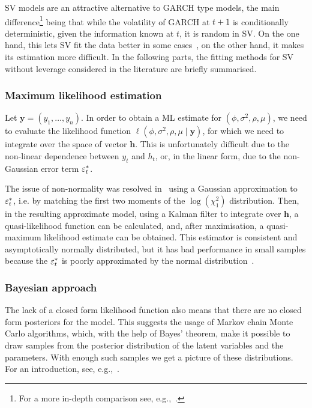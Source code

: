 SV models are an attractive alternative to GARCH type models, the main difference\footnote{For a more in-depth comparison see, e.g.,~\citet{Harvey1994}.} being that while the volatility of GARCH at $t+1$ is conditionally deterministic, given the information known at $t$, it is random in SV.
On the one hand, this lets SV fit the data better in some cases~\citep{Kim1998,Chan2016}, on the other hand, it makes its estimation more difficult. In the following parts, the fitting methods for SV without leverage considered in the literature are briefly summarised.

\subsubsection{Maximum likelihood estimation}

Let $\bm{y}=(y_1,\dots,y_n)$.
In order to obtain a ML estimate for $(\phi,\sigma^2,\rho,\mu)$, we need to evaluate the likelihood function $\ell(\phi,\sigma^2,\rho,\mu\mid\bm{y})$, for which we need to integrate over the space of vector $\bm{h}$.
This is unfortunately difficult due to the non-linear dependence between $y_t$ and $h_t$, or, in the linear form, due to the non-Gaussian error term $\varepsilon_t^\ast$.

The issue of non-normality was resolved in~\citet{Harvey1994} using a Gaussian approximation to $\varepsilon_t^\ast$, i.e. by matching the first two moments of the $\log(\chi_1^2)$ distribution.
Then, in the resulting approximate model, using a Kalman filter to integrate over $\bm{h}$, a quasi-likelihood function can be calculated, and, after maximisation, a quasi-maximum likelihood estimate can be obtained.
This estimator is consistent and asymptotically normally distributed, but it has bad performance in small samples because the $\varepsilon_t^\ast$ is poorly approximated by the normal distribution~\citep{Kim1998}.

\subsubsection{Bayesian approach}

The lack of a closed form likelihood function also means that there are no closed form posteriors for the model.
This suggests the usage of Markov chain Monte Carlo algorithms, which, with the help of Bayes' theorem, make it possible to draw samples from the posterior distribution of the latent variables and the parameters.
With enough such samples we get a picture of these distributions.
For an introduction, see, e.g.,~\citet{Geyer2011}.

